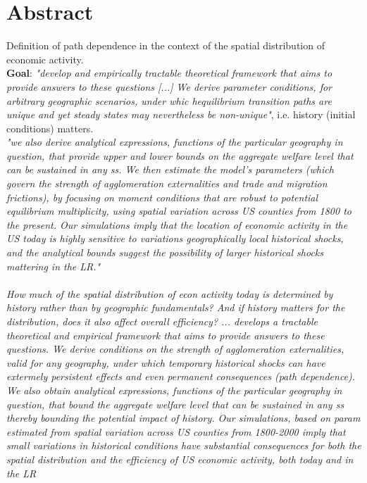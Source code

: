 \documentclass[10pt, final]{article}
\begin{document}
\iffalse








\newpage

\section{Abstract} %
\label{sec:abstract}

Definition of path dependence in the context of the spatial distribution of economic activity. \\
\textbf{Goal}: \textit{"develop and empirically tractable theoretical framework that aims to provide answers to these questions [...] We derive parameter conditions, for arbitrary geographic scenarios, under whic hequilibrium transition paths are unique and yet steady states may nevertheless be non-unique"}, i.e. history (initial conditions) matters.
\\
\textit{"we also derive analytical expressions, functions of the particular geography in question, that provide upper and lower bounds on the aggregate welfare level that can be sustained in any ss. We then estimate the model's parameters (which govern the strength of agglomeration externalities and trade and migration frictions), by focusing on moment conditions that are robust to potential equilibrium multiplicity, using spatial variation across US counties from 1800 to the present. Our simulations imply that the location of economic activity in the US today is highly sensitive to variations geographically local historical shocks, and the analytical bounds suggest the possibility of larger historical shocks mattering in the LR."}
\\
\\
\textit{How much of the spatial distribution of econ activity today is determined by history rather than by geographic fundamentals? And if history matters for the distribution, does it also affect overall efficiency? ... develops a tractable theoretical and empirical framework that aims to provide answers to these questions. We derive conditions on the strength of agglomeration externalities, valid for any geography, under which temporary historical shocks can have extermely persistent effects and even permanent consequences (path dependence). We also obtain analytical expressions, functions of the particular geography in question, that bound the aggregate welfare level that can be sustained in any ss thereby bounding the potential impact of history. Our simulations, based on param estimated from spatial variation across US counties from 1800-2000 imply that small variations in historical conditions have substantial consequences for both the spatial distribution and the efficiency of US economic activity, both today and in the LR}
\end{document}
